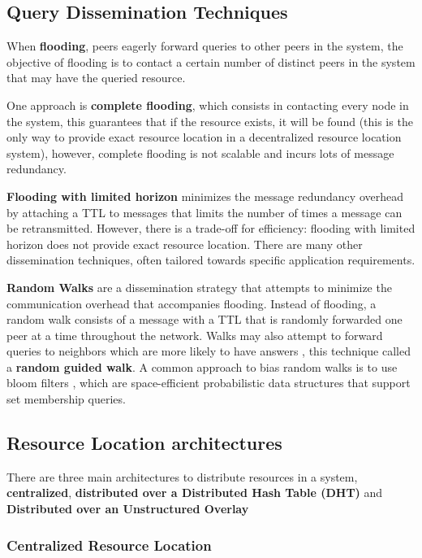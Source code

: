 \subsection{Query Dissemination Techniques}

When \textbf{flooding}, peers eagerly forward queries to other peers in the system, the objective of flooding is to contact a certain number of distinct peers in the system that may have the queried resource.

One approach is \textbf{complete flooding}, which consists in contacting every node in the system, this guarantees that if the resource exists, it will be found (this is the only way to provide exact resource location in a decentralized resource location system), however, complete flooding is not scalable and incurs lots of message redundancy. 

\textbf{Flooding with limited horizon} minimizes the message redundancy overhead by attaching a TTL to messages that limits the number of times a message can be retransmitted. However, there is a trade-off for efficiency: flooding with limited horizon does not provide exact resource location. There are many other dissemination techniques, often tailored towards specific application requirements.

\textbf{Random Walks} are a dissemination strategy that attempts to minimize the communication overhead that accompanies flooding. Instead of flooding, a random walk consists of a message with a TTL that is randomly forwarded one peer at a time throughout the network. Walks may also attempt to forward queries to neighbors which are more likely to have answers \cite{1022239}, this technique called a \textbf{random guided walk}. A common approach to bias random walks is to use bloom filters \cite{5751342}, which are space-efficient probabilistic data structures that support set membership queries.

\subsection{Resource Location architectures}

There are three main architectures to distribute resources in a system, \textbf{centralized}, \textbf{distributed over a Distributed Hash Table (DHT)} and \textbf{Distributed over an Unstructured Overlay} 

\subsubsection{Centralized Resource Location}

